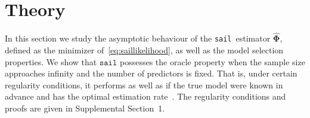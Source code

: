 \documentclass[a4paper,fleqn]{cas-sc}
\makeatletter
\newcommand{\sail}{\texttt{sail}}
\newcommand{\btheta}{\boldsymbol{\theta}}
\newcommand{\bPhi}{\boldsymbol{\Phi}}
\newcommand{\bPsi}{\boldsymbol{\Psi}}
\DeclareMathOperator*{\argmin}{arg\,min}
\DeclarePairedDelimiter\abs{\lvert}{\rvert}%
\DeclarePairedDelimiter\norm{\lVert}{\rVert}%
\let\oldabs\abs
\def\abs{\@ifstar{\oldabs}{\oldabs*}}
\let\oldnorm\norm
\def\norm{\@ifstar{\oldnorm}{\oldnorm*}}
\makeatother
\begin{document}

\section{Theory} \label{sec:theory}


In this section we study the asymptotic behaviour of the \sail ~estimator $\widehat{\bPhi}$, defined as the minimizer of~\eqref{eq:saillikelihood}, as well as the model selection properties. We show that $\texttt{{sail}}$ possesses the oracle property when the sample size approaches infinity and the number of predictors is fixed. That is, under certain regularity conditions, it performs as well as if the true model were known in advance and has the optimal estimation rate~\citep{zou2006adaptive}. The regularity conditions and proofs are given in Supplemental Section~1. 

\end{document}
